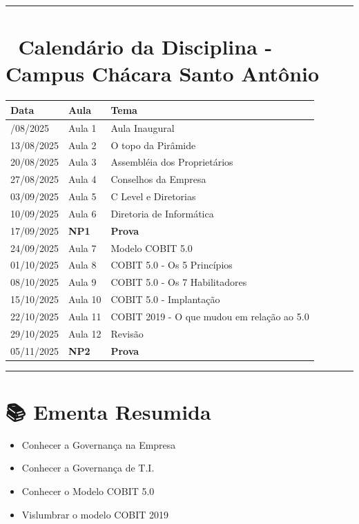 \documentclass[
]{book}
\begin{document}
\begin{center}\rule{0.5\linewidth}{0.5pt}\end{center}

\section{📅 Calendário da Disciplina - Campus Chácara Santo Antônio}\label{calenduxe1rio-da-disciplina---campus-chuxe1cara-santo-antuxf4nio}

\begin{longtable}[]{@{}lll@{}}
\toprule\noalign{}
Data & Aula & Tema \\
\midrule\noalign{}
\endhead
\bottomrule\noalign{}
\endlastfoot
06/08/2025 & Aula 1 & Aula Inaugural \\
13/08/2025 & Aula 2 & O topo da Pirâmide \\
20/08/2025 & Aula 3 & Assembléia dos Proprietários \\
27/08/2025 & Aula 4 & Conselhos da Empresa \\
03/09/2025 & Aula 5 & C Level e Diretorias \\
10/09/2025 & Aula 6 & Diretoria de Informática \\
17/09/2025 & \textbf{NP1} & \textbf{Prova} \\
24/09/2025 & Aula 7 & Modelo COBIT 5.0 \\
01/10/2025 & Aula 8 & COBIT 5.0 - Os 5 Princípios \\
08/10/2025 & Aula 9 & COBIT 5.0 - Os 7 Habilitadores \\
15/10/2025 & Aula 10 & COBIT 5.0 - Implantação \\
22/10/2025 & Aula 11 & COBIT 2019 - O que mudou em relação ao 5.0 \\
29/10/2025 & Aula 12 & Revisão \\
05/11/2025 & \textbf{NP2} & \textbf{Prova} \\
\end{longtable}

\begin{center}\rule{0.5\linewidth}{0.5pt}\end{center}

\section{📚 Ementa Resumida}\label{ementa-resumida}

\begin{itemize}
\item
  Conhecer a Governança na Empresa
\item
  Conhecer a Governança de T.I.
\item
  Conhecer o Modelo COBIT 5.0
\item
  Vislumbrar o modelo COBIT 2019
\end{itemize}
\end{document}
